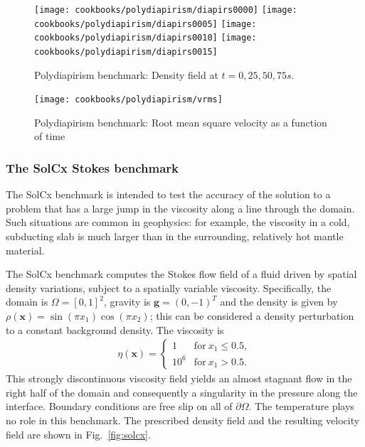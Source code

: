 \documentclass{article}
\begin{document}
\begin{figure}
    \centering
    \texttt{[image: cookbooks/polydiapirism/diapirs0000]}
    \texttt{[image: cookbooks/polydiapirism/diapirs0005]}
    \texttt{[image: cookbooks/polydiapirism/diapirs0010]}
    \texttt{[image: cookbooks/polydiapirism/diapirs0015]}
    \caption{Polydiapirism benchmark: Density field at $t=0,25,50,75\si{s}$.}
    \label{fig:polydiapirs_density}
\end{figure}

\begin{figure}
    \centering
    \texttt{[image: cookbooks/polydiapirism/vrms]}
    \caption{Polydiapirism benchmark: Root mean square velocity as a function of time}
    \label{fig:polydiapirs_vrms}
\end{figure}

\subsubsection{The SolCx Stokes benchmark}
\label{sec:benchmark-solcx}

The SolCx benchmark is intended to test the accuracy of the solution to a
problem that has a large jump in the viscosity along a line through the
domain. Such situations are common in geophysics: for example, the viscosity
in a cold, subducting slab is much larger than in the surrounding, relatively
hot mantle material.

The SolCx benchmark computes the Stokes flow field of a fluid driven by
spatial density variations, subject to a spatially variable
viscosity. Specifically, the domain is $\Omega=[0,1]^2$, gravity is $\mathbf
g=(0,-1)^T$ and the density is given
by $\rho(\mathbf x)=\sin(\pi x_1)\cos(\pi x_2)$; this can be considered a
density perturbation to a constant background density. The viscosity is
\begin{align*}
  \eta(\mathbf x) = \left\{
    \begin{matrix}
      1 & \text{for}\ x_1 \le 0.5, \\
      10^6 & \text{for}\ x_1  > 0.5.
    \end{matrix}
  \right.
\end{align*}
This strongly discontinuous viscosity field yields an almost stagnant flow in
the right half of the domain and consequently a singularity in the pressure
along the interface.
Boundary conditions are free slip on all of $\partial\Omega$. The temperature
plays no role in this benchmark. The prescribed density field and the
resulting velocity field are shown in Fig.~\ref{fig:solcx}.
\end{document}
